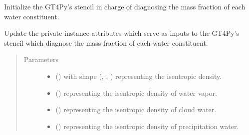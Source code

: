 \documentclass[letterpaper,10pt,english]{sphinxmanual}
\begin{document}
\begin{fulllineitems}
\begin{fulllineitems}
\label{\detokenize{api:dycore.diagnostic_isentropic.DiagnosticIsentropic._stencil_diagnosing_mass_fraction_of_water_constituents_in_air_initialize}}
Initialize the GT4Py’s stencil in charge of diagnosing the mass fraction of each water constituent.

\end{fulllineitems}


\begin{fulllineitems}
\label{\detokenize{api:dycore.diagnostic_isentropic.DiagnosticIsentropic._stencil_diagnosing_mass_fraction_of_water_constituents_in_air_set_inputs}}
Update the private instance attributes which serve as inputs to the GT4Py’s stencil which diagnose
the mass fraction of each water constituent.
\begin{quote}\begin{description}
\item[{Parameters}] \leavevmode\begin{itemize}
\item {} 
 () \textendash{}  with shape (, , ) representing the isentropic density.

\item {} 
 () \textendash{}  representing the isentropic density of water vapor.

\item {} 
 () \textendash{}  representing the isentropic density of cloud water.

\item {} 
 () \textendash{}  representing the isentropic density of precipitation water.


\end{itemize}
\end{description}
\end{quote}
\end{fulllineitems}
\end{fulllineitems}
\end{document}
